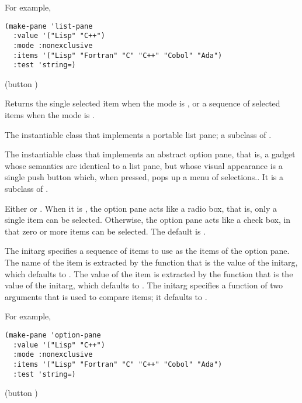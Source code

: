 For example,

\begin{verbatim}
(make-pane 'list-pane
  :value '("Lisp" "C++")
  :mode :nonexclusive
  :items '("Lisp" "Fortran" "C" "C++" "Cobol" "Ada")
  :test 'string=)
\end{verbatim}

 {(button )}

Returns the single selected item when the mode is , or a sequence
of selected items when the mode is .


The instantiable class that implements a portable list pane; a subclass of
.


The instantiable class that implements an abstract option pane, that is, a
gadget whose semantics are identical to a list pane, but whose visual appearance
is a single push button which, when pressed, pops up a menu of selections..  It
is a subclass of .


Either  or .  When it is , the
option pane acts like a radio box, that is, only a single item can be selected.
Otherwise, the option pane acts like a check box, in that zero or more items can
be selected. The default is .


The  initarg specifies a sequence of items to use as the items of the
option pane.  The name of the item is extracted by the function that is the value
of the  initarg, which defaults to .  The
value of the item is extracted by the function that is the value of the
 initarg, which defaults to .  The 
initarg specifies a function of two arguments that is used to compare items; it
defaults to .

For example,

\begin{verbatim}
(make-pane 'option-pane
  :value '("Lisp" "C++")
  :mode :nonexclusive
  :items '("Lisp" "Fortran" "C" "C++" "Cobol" "Ada")
  :test 'string=)
\end{verbatim}

 {(button )}


